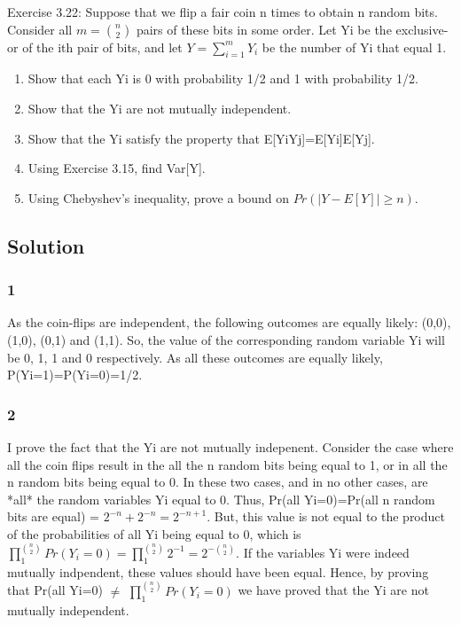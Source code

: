 \documentclass[10pt]{article}
\begin{document}
Exercise 3.22: Suppose that we flip a fair coin n times to obtain n random bits. Consider all $m = \binom{n}{2}$ pairs of these bits in some order. Let Yi be the exclusive-or of the ith pair of bits, and let $Y=\sum_{i=1}^{m}Y_{i}$ be the number of Yi that equal 1.

\begin{enumerate}
\item      Show that each Yi is 0 with probability 1/2 and 1 with probability 1/2.
\item      Show that the Yi are not mutually independent.
\item      Show that the Yi satisfy the property that E[YiYj]=E[Yi]E[Yj].
\item      Using Exercise 3.15, find Var[Y].
\item      Using Chebyshev's inequality, prove a bound on $Pr(|Y-E[Y]|\geq n)$.

\end{enumerate}

\subsection{Solution}

\subsubsection*{1} As the coin-flips are independent, the following outcomes are equally likely: (0,0), (1,0), (0,1) and (1,1). So, the value of the corresponding random variable Yi will be 0, 1, 1 and 0 respectively. As all these outcomes are equally likely, P(Yi=1)=P(Yi=0)=1/2.

\subsubsection*{2} I prove the fact that the Yi are not mutually indepenent. Consider the case where all the coin flips result in the all the n random bits being equal to 1, or in all the n random bits being equal to 0. In these two cases, and in no other cases, are *all* the random variables Yi equal to 0. Thus, Pr(all Yi=0)=Pr(all n random bits are equal) = $2^{-n}+2^{-n}=2^{-n+1}$. But, this value is not equal to the product of the probabilities of all Yi being equal to 0, which is $\prod_{1}^{\binom{n}{2}}Pr(Y_{i}=0)=\prod_{1}^{\binom{n}{2}}2^{-1}=2^{-\binom{n}{2}}$. If the variables Yi were indeed mutually indpendent, these values should have been equal. Hence, by proving that Pr(all Yi=0) $\neq$ $\prod_{1}^{\binom{n}{2}} Pr(Y_{i}=0)$ we have proved that the Yi are not mutually independent.
\end{document}
